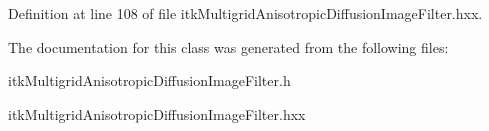Definition at line 108 of file itk\-Multigrid\-Anisotropic\-Diffusion\-Image\-Filter.\-hxx.



The documentation for this class was generated from the following files\-:\begin{DoxyCompactItemize}
\item 
itk\-Multigrid\-Anisotropic\-Diffusion\-Image\-Filter.\-h\item 
itk\-Multigrid\-Anisotropic\-Diffusion\-Image\-Filter.\-hxx\end{DoxyCompactItemize}
